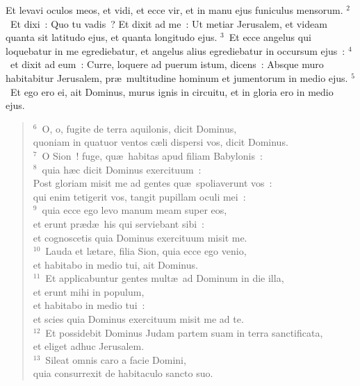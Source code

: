 \bchapter
\lettrine[lines=3,image=true,loversize=0.05,lraise=-0.03]{E}{}t levavi oculos meos, et vidi, et ecce vir, et in manu ejus funiculus mensorum.
${}^{2}$~Et dixi~: Quo tu vadis~? Et dixit ad me~: Ut metiar Jerusalem, et videam quanta sit latitudo ejus, et quanta longitudo ejus.
${}^{3}$~Et ecce angelus qui loquebatur in me egrediebatur, et angelus alius egrediebatur in occursum ejus~:
${}^{4}$~et dixit ad eum~: Curre, loquere ad puerum istum, dicens~: Absque muro habitabitur Jerusalem, pr\ae\ multitudine hominum et jumentorum in medio ejus.
${}^{5}$~Et ego ero ei, ait Dominus, murus ignis in circuitu, et in gloria ero in medio ejus.
\begin{flushleft}\begin{verse}${}^{6}$~O, o, fugite de terra aquilonis, dicit Dominus,\\ quoniam in quatuor ventos c\ae li dispersi vos, dicit Dominus.\\
${}^{7}$~O Sion~! fuge, qu\ae\ habitas apud filiam Babylonis~:\\
${}^{8}$~quia h\ae c dicit Dominus exercituum~:\\ Post gloriam misit me ad gentes qu\ae\ spoliaverunt vos~:\\ qui enim tetigerit vos, tangit pupillam oculi mei~:\\
${}^{9}$~quia ecce ego levo manum meam super eos,\\ et erunt pr\ae d\ae\ his qui serviebant sibi~:\\ et cognoscetis quia Dominus exercituum misit me.\\
${}^{10}$~Lauda et l\ae tare, filia Sion, quia ecce ego venio,\\ et habitabo in medio tui, ait Dominus.\\
${}^{11}$~Et applicabuntur gentes mult\ae\ ad Dominum in die illa,\\ et erunt mihi in populum,\\ et habitabo in medio tui~:\\ et scies quia Dominus exercituum misit me ad te.\\
${}^{12}$~Et possidebit Dominus Judam partem suam in terra sanctificata,\\ et eliget adhuc Jerusalem.\\
${}^{13}$~Sileat omnis caro a facie Domini,\\ quia consurrexit de habitaculo sancto suo.\end{verse}\end{flushleft}



